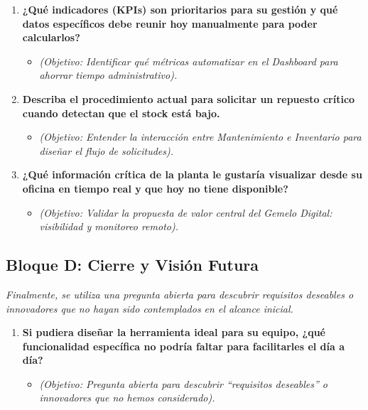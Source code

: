 \documentclass[12pt, a4paper]{article}
\begin{document}
\begin{enumerate}
    \item \textbf{¿Qué indicadores (KPIs) son prioritarios para su gestión y qué datos específicos debe reunir hoy manualmente para poder calcularlos?}
    \begin{itemize}
        \item \textit{(Objetivo: Identificar qué métricas automatizar en el Dashboard para ahorrar tiempo administrativo).}
    \end{itemize}
    \item \textbf{Describa el procedimiento actual para solicitar un repuesto crítico cuando detectan que el stock está bajo.}
    \begin{itemize}
        \item \textit{(Objetivo: Entender la interacción entre Mantenimiento e Inventario para diseñar el flujo de solicitudes).}
    \end{itemize}
    \item \textbf{¿Qué información crítica de la planta le gustaría visualizar desde su oficina en tiempo real y que hoy no tiene disponible?}
    \begin{itemize}
        \item \textit{(Objetivo: Validar la propuesta de valor central del Gemelo Digital: visibilidad y monitoreo remoto).}
    \end{itemize}
\end{enumerate}

\subsection{Bloque D: Cierre y Visión Futura}

\textit{Finalmente, se utiliza una pregunta abierta para descubrir requisitos deseables o innovadores que no hayan sido contemplados en el alcance inicial.}

\begin{enumerate}
    \item \textbf{Si pudiera diseñar la herramienta ideal para su equipo, ¿qué funcionalidad específica no podría faltar para facilitarles el día a día?}
    \begin{itemize}
        \item \textit{(Objetivo: Pregunta abierta para descubrir ``requisitos deseables'' o innovadores que no hemos considerado).}
    \end{itemize}
\end{enumerate}
\end{document}
